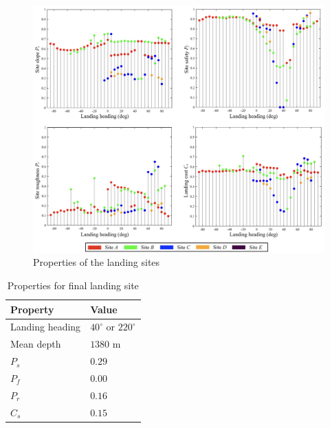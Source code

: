 \begin{figure}[!ht]
\centering
\includegraphics[width=\textwidth]{./images/mehul23.png}
\caption{Properties of the landing sites}
\label{f:mehul23}
\end{figure}


\begin{table}[!ht]
\centering
\caption{Properties for final landing site}
\begin{tabular}{  |p{6cm}  p{4cm}| }
\hline
\textbf{Property} & \textbf{Value}\\ \hline 
Landing heading & $40^\circ$ or $220^\circ$ \\
Mean depth & $1380$ m\\
$P_s$ & $0.29$\\
$P_f$ & $0.00$\\
$P_r$ & $0.16$\\
$C_s$ & $0.15$\\
\hline
\end{tabular}
\label{t:table5}
\end{table}
